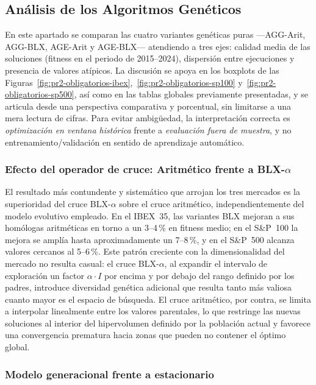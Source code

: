 \subsection{Análisis de los Algoritmos Genéticos}

En este apartado se comparan las cuatro variantes genéticas puras ---AGG-Arit, AGG-BLX, AGE-Arit y AGE-BLX--- atendiendo a tres ejes: calidad media de las soluciones (fitness en el periodo de 2015--2024), dispersión entre ejecuciones y presencia de valores atípicos. La discusión se apoya en los boxplots de las Figuras~\ref{fig:pr2-obligatorios-ibex},~\ref{fig:pr2-obligatorios-sp100} y~\ref{fig:pr2-obligatorios-sp500}, así como en las tablas globales previamente presentadas, y se articula desde una perspectiva comparativa y porcentual, sin limitarse a una mera lectura de cifras. Para evitar ambigüedad, la interpretación correcta es \textit{optimización en ventana histórica} frente a \textit{evaluación fuera de muestra}, y no entrenamiento/validación en sentido de aprendizaje automático.

\subsubsection*{Efecto del operador de cruce: Aritmético frente a BLX-$\alpha$}

El resultado más contundente y sistemático que arrojan los tres mercados es la superioridad del cruce BLX-$\alpha$ sobre el cruce aritmético, independientemente del modelo evolutivo empleado. En el IBEX~35, las variantes BLX mejoran a sus homólogas aritméticas en torno a un 3--4\,\% en fitness medio; en el S\&P~100 la mejora se amplía hasta aproximadamente un 7--8\,\%, y en el S\&P~500 alcanza valores cercanos al 5--6\,\%. Este patrón creciente con la dimensionalidad del mercado no resulta casual: el cruce BLX-$\alpha$, al expandir el intervalo de exploración un factor $\alpha\!\cdot\!I$ por encima y por debajo del rango definido por los padres, introduce diversidad genética adicional que resulta tanto más valiosa cuanto mayor es el espacio de búsqueda. El cruce aritmético, por contra, se limita a interpolar linealmente entre los valores parentales, lo que restringe las nuevas soluciones al interior del hipervolumen definido por la población actual y favorece una convergencia prematura hacia zonas que pueden no contener el óptimo global.

\subsubsection*{Modelo generacional frente a estacionario}

